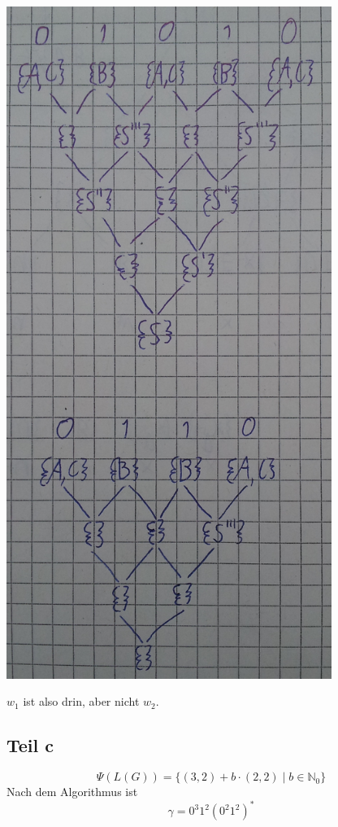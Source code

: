 \documentclass[10pt,a4paper]{article}
\begin{document}
\includegraphics[width=300pt]{pflicht1_4_b.png}

$w_{1}$ ist also drin, aber nicht $w_{2}$.

\subsection{Teil c}

\begin{equation}
  \Psi(L(G)) = \{ (3, 2) + b \cdot (2, 2) \mid b \in \mathbb{N}_{0} \}
\end{equation}
Nach dem Algorithmus ist
\begin{equation}
  \gamma = 0^{3}1^{2}(0^{2}1^{2})^{*}
\end{equation}
\end{document}
